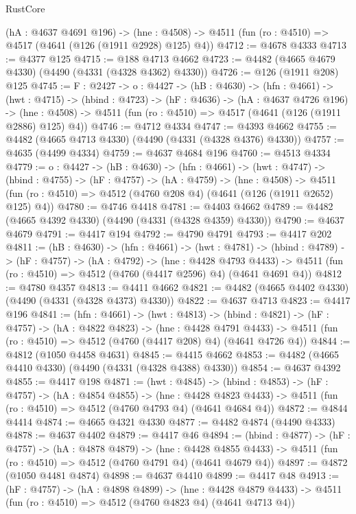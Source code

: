 \begin{lexlean}{RustCore}
\begin{coremodule}
  (hA : @4637 @4691 @196) ->
  (hne : @4508) -> @4511 (fun (ro : @4510) => @4517 (@4641 (@126 (@1911 @2928) @125) @4))
@4712 := @4678 @4333
@4713 := @4377 @125
@4715 := @188 @4713 @4662
@4723 := @4482 (@4665 @4679 @4330) (@4490 (@4331 (@4328 @4362) @4330))
@4726 := @126 (@1911 @208) @125
@4745 := {F : @2427} ->
  {o : @4427} ->
  (hB : @4630) ->
  (hfn : @4661) ->
  (hwt : @4715) ->
  (hbind : @4723) ->
  (hF : @4636) ->
  (hA : @4637 @4726 @196) ->
  (hne : @4508) -> @4511 (fun (ro : @4510) => @4517 (@4641 (@126 (@1911 @2886) @125) @4))
@4746 := @4712 @4334
@4747 := @4393 @4662
@4755 := @4482 (@4665 @4713 @4330) (@4490 (@4331 (@4328 @4376) @4330))
@4757 := @4635 (@4499 @4334)
@4759 := @4637 @4684 @196
@4760 := @4513 @4334
@4779 := {o : @4427} ->
  (hB : @4630) ->
  (hfn : @4661) ->
  (hwt : @4747) ->
  (hbind : @4755) ->
  (hF : @4757) ->
  (hA : @4759) ->
  (hne : @4508) ->
  @4511 (fun (ro : @4510) => @4512 (@4760 @208 @4) (@4641 (@126 (@1911 @2652) @125) @4))
@4780 := @4746 @4418
@4781 := @4403 @4662
@4789 := @4482 (@4665 @4392 @4330) (@4490 (@4331 (@4328 @4359) @4330))
@4790 := @4637 @4679
@4791 := @4417 @194
@4792 := @4790 @4791
@4793 := @4417 @202
@4811 := (hB : @4630) ->
  (hfn : @4661) ->
  (hwt : @4781) ->
  (hbind : @4789) ->
  (hF : @4757) ->
  (hA : @4792) ->
  (hne : @4428 @4793 @4433) ->
  @4511 (fun (ro : @4510) => @4512 (@4760 (@4417 @2596) @4) (@4641 @4691 @4))
@4812 := @4780 @4357
@4813 := @4411 @4662
@4821 := @4482 (@4665 @4402 @4330) (@4490 (@4331 (@4328 @4373) @4330))
@4822 := @4637 @4713
@4823 := @4417 @196
@4841 := (hfn : @4661) ->
  (hwt : @4813) ->
  (hbind : @4821) ->
  (hF : @4757) ->
  (hA : @4822 @4823) ->
  (hne : @4428 @4791 @4433) ->
  @4511 (fun (ro : @4510) => @4512 (@4760 (@4417 @208) @4) (@4641 @4726 @4))
@4844 := @4812 (@1050 @4458 @4631)
@4845 := @4415 @4662
@4853 := @4482 (@4665 @4410 @4330) (@4490 (@4331 (@4328 @4388) @4330))
@4854 := @4637 @4392
@4855 := @4417 @198
@4871 := (hwt : @4845) ->
  (hbind : @4853) ->
  (hF : @4757) ->
  (hA : @4854 @4855) ->
  (hne : @4428 @4823 @4433) -> @4511 (fun (ro : @4510) => @4512 (@4760 @4793 @4) (@4641 @4684 @4))
@4872 := @4844 @4414
@4874 := @4665 @4321 @4330
@4877 := @4482 @4874 (@4490 @4333)
@4878 := @4637 @4402
@4879 := @4417 @46
@4894 := (hbind : @4877) ->
  (hF : @4757) ->
  (hA : @4878 @4879) ->
  (hne : @4428 @4855 @4433) -> @4511 (fun (ro : @4510) => @4512 (@4760 @4791 @4) (@4641 @4679 @4))
@4897 := @4872 (@1050 @4481 @4874)
@4898 := @4637 @4410
@4899 := @4417 @48
@4913 := (hF : @4757) ->
  (hA : @4898 @4899) ->
  (hne : @4428 @4879 @4433) -> @4511 (fun (ro : @4510) => @4512 (@4760 @4823 @4) (@4641 @4713 @4))

\end{coremodule}
\end{lexlean}

